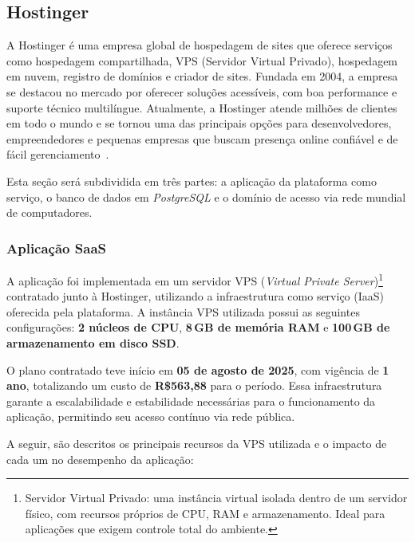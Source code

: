 

\subsection{Hostinger}
\par A Hostinger é uma empresa global de hospedagem de sites que oferece serviços como hospedagem compartilhada, VPS (Servidor Virtual Privado), hospedagem em nuvem, registro de domínios e criador de sites. Fundada em 2004, a empresa se destacou no mercado por oferecer soluções acessíveis, com boa performance e suporte técnico multilíngue. Atualmente, a Hostinger atende milhões de clientes em todo o mundo e se tornou uma das principais opções para desenvolvedores, empreendedores e pequenas empresas que buscam presença online confiável e de fácil gerenciamento~\cite{hostinger2025}.
\par Esta seção será subdividida em três partes: a aplicação da plataforma como serviço, o banco de dados em \textit{PostgreSQL} e o domínio de acesso via rede mundial de computadores.


\subsubsection{Aplicação SaaS}
\par A aplicação foi implementada em um servidor VPS (\textit{Virtual Private Server})\footnote{Servidor Virtual Privado: uma instância virtual isolada dentro de um servidor físico, com recursos próprios de CPU, RAM e armazenamento. Ideal para aplicações que exigem controle total do ambiente.} contratado junto à Hostinger, utilizando a infraestrutura como serviço (IaaS) oferecida pela plataforma. A instância VPS utilizada possui as seguintes configurações: \textbf{2 núcleos de CPU}, \textbf{8\,GB de memória RAM} e \textbf{100\,GB de armazenamento em disco SSD}.
\par O plano contratado teve início em \textbf{05 de agosto de 2025}, com vigência de \textbf{1 ano}, totalizando um custo de \textbf{R\$563,88} para o período. Essa infraestrutura garante a escalabilidade e estabilidade necessárias para o funcionamento da aplicação, permitindo seu acesso contínuo via rede pública.
\par A seguir, são descritos os principais recursos da VPS utilizada e o impacto de cada um no desempenho da aplicação:

